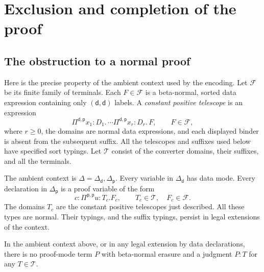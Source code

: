 \section{Exclusion and completion of the proof}\label{sec:conclusion}

\subsection{The obstruction to a normal proof}

Here is the precise property of the ambient context used by the encoding.
Let $\mathcal F$ be its finite family of terminals.  Each $F\in\mathcal F$
is a beta-normal, sorted data expression containing only
$(\mathsf d,\mathsf d)$ labels.  A \emph{constant positive telescope} is
an expression
\[
 \Pi^{\mathsf d,\mathsf p}x_1:D_1.\,
 \cdots\Pi^{\mathsf d,\mathsf p}x_r:D_r.\,F,
 \qquad F\in\mathcal F,
\]
where $r\geq0$, the domains are normal data expressions, and each displayed
binder is absent from the subsequent suffix.  All the telescopes and suffixes
used below have specified sort typings.  Let $\mathcal T$ consist of the
converter domains, their suffixes, and all the terminals.

The ambient context is $\Delta=\Delta_{\mathsf d},\Delta_{\mathsf p}$.
Every variable in $\Delta_{\mathsf d}$ has data mode.  Every declaration
in $\Delta_{\mathsf p}$ is a proof variable of the form
\[
 c:\Pi^{\mathsf p,\mathsf p}u:T_c.F_c,
 \qquad T_c\in\mathcal T,\quad F_c\in\mathcal F.
\]
The domains $T_c$ are the constant positive telescopes just described.
All these types are normal.  Their typings, and the suffix typings, persist
in legal extensions of the context.

\begin{lemma}
\label{lem:enc-no-normal-proof}
In the ambient context above, or in any legal extension by data declarations,
there is no proof-mode term $P$ with beta-normal erasure and a judgment
$P:T$ for any $T\in\mathcal T$.
\end{lemma}

